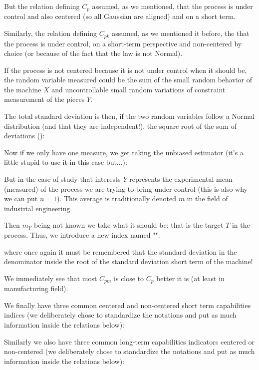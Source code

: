 	But the relation defining $C_p$ assumed, as we mentioned, that the process is under control and also centered (so all Gaussian are aligned) and on a short term.
	
	Similarly, the relation defining $C_{pk}$ assumed, as we mentioned it before, the that the process is under control, on a short-term perspective and non-centered by choice (or because of the fact that the law is not Normal).
	
	If the process is not centered because it is not under control when it should be, the random variable measured could be the sum of the small random behavior of the machine $X$ and uncontrollable small random variations of constraint measurement of the pieces $Y$.
	
	The total standard deviation is then, if the two random variables follow a Normal distribution (and that they are independent!), the square root of the sum of deviations ():
	
	Now if we only have one measure, we get taking the unbiased estimator (it's a little stupid to use it in this case but...):
	
	But in the case of study that interests $Y$ represents the experimental mean (measured) of the process we are trying to bring under control (this is also why we can put $n=1$). This average is traditionally denoted $m$ in the field of industrial engineering.
	
	Then $m_Y$ being not known we take what it should be: that is the target $T$ in the process. Thus, we introduce a new index named "":
	
	where once again it must be remembered that the standard deviation in the denominator inside the root of the standard deviation short term of the machine!
	
	We immediately see that most $C_{pm}$ is close to $C_{p}$ better it is (at least in manufacturing field).
	
	We finally have three common centered and non-centered short term capabilities indices (we deliberately chose to standardize the notations and put as much information inside the relations below):
	
	Similarly we also have three common long-term capabilities indicators centered or non-centered (we deliberately chose to standardize the notations and put as much information inside the relations below):
	
